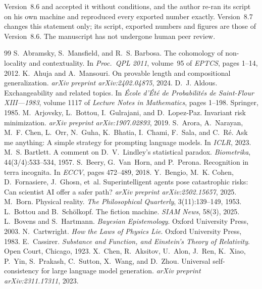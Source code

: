 \documentclass[11pt,a4paper]{article}
\theoremstyle{definition}
\theoremstyle{remark}
\begin{document}
Version~8.6 and accepted it without conditions, and the author re-ran its script on his own machine and reproduced every exported number exactly. Version~8.7 changes this statement only; its script, exported numbers and figures are those of Version~8.6. The manuscript has not undergone human peer review.

\begin{thebibliography}{99}
 S.~Abramsky, S.~Mansfield, and R.~S. Barbosa. The cohomology of non-locality and contextuality. In \emph{Proc.\ QPL 2011}, volume~95 of \emph{EPTCS}, pages 1--14, 2012.
 K.~Ahuja and A.~Mansouri. On provable length and compositional generalization. \emph{arXiv preprint arXiv:2402.04875}, 2024.
 D.~J. Aldous. Exchangeability and related topics. In \emph{\'Ecole d'\'Et\'e de Probabilit\'es de Saint-Flour XIII---1983}, volume 1117 of \emph{Lecture Notes in Mathematics}, pages 1--198. Springer, 1985.
 M.~Arjovsky, L.~Bottou, I.~Gulrajani, and D.~Lopez-Paz. Invariant risk minimization. \emph{arXiv preprint arXiv:1907.02893}, 2019.
 S.~Arora, A.~Narayan, M.~F. Chen, L.~Orr, N.~Guha, K.~Bhatia, I.~Chami, F.~Sala, and C.~R\'e. Ask me anything: A simple strategy for prompting language models. In \emph{ICLR}, 2023.
 M.~S. Bartlett. A comment on {D.\ V.\ Lindley's} statistical paradox. \emph{Biometrika}, 44(3/4):533--534, 1957.
 S.~Beery, G.~Van~Horn, and P.~Perona. Recognition in terra incognita. In \emph{ECCV}, pages 472--489, 2018.
 Y.~Bengio, M.~K. Cohen, D.~Fornasiere, J.~Ghosn, et~al. Superintelligent agents pose catastrophic risks: Can scientist {AI} offer a safer path? \emph{arXiv preprint arXiv:2502.15657}, 2025.
 M.~Born. Physical reality. \emph{The Philosophical Quarterly}, 3(11):139--149, 1953.
 L.~Bottou and B.~Sch\"olkopf. The fiction machine. \emph{SIAM News}, 58(3), 2025.
 L.~Bovens and S.~Hartmann. \emph{Bayesian Epistemology}. Oxford University Press, 2003.
 N.~Cartwright. \emph{How the Laws of Physics Lie}. Oxford University Press, 1983.
 E.~Cassirer. \emph{Substance and Function, and Einstein's Theory of Relativity}. Open Court, Chicago, 1923.
 X.~Chen, R.~Aksitov, U.~Alon, J.~Ren, K.~Xiao, P.~Yin, S.~Prakash, C.~Sutton, X.~Wang, and D.~Zhou. Universal self-consistency for large language model generation. \emph{arXiv preprint arXiv:2311.17311}, 2023.

\end{thebibliography}
\end{document}
